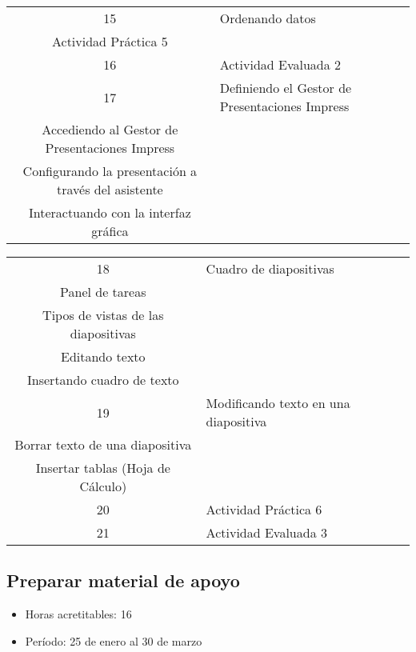 \begin{center}
\begin{tabular}{|c|p{10cm}|}
                        15 & \raggedright Ordenando datos
                        \\ Actividad Práctica 5
                        \tabularnewline \hline
                        
                        16 & \raggedright Actividad Evaluada 2
                        \tabularnewline \hline

                        17 & \raggedright Definiendo el Gestor de Presentaciones Impress
                        \\ Accediendo al Gestor de Presentaciones Impress
                        \\ Configurando la presentación a través del asistente
                        \\ Interactuando con la interfaz gráfica
                        \tabularnewline \hline
                         
                        \end{tabular}     
                        
                        \begin{tabular}{|c|p{10cm}|}\hline 
                        
                        18 & \raggedright Cuadro de diapositivas
                        \\ Panel de tareas
                        \\ Tipos de vistas de las diapositivas
                        \\ Editando texto
                        \\ Insertando cuadro de texto
                        \tabularnewline \hline
                        19 & \raggedright Modificando texto en una diapositiva
                        \\ Borrar texto de una diapositiva
                        \\ Insertar tablas (Hoja de Cálculo)
                        \tabularnewline \hline
                        
                        20 & \raggedright Actividad Práctica 6
                        \tabularnewline \hline
                        21 & \raggedright Actividad Evaluada 3
                        \tabularnewline \hline
                        
            \end{tabular}                                
            \end{center}	 
             \subsection {Preparar material de apoyo}
             \begin{itemize}
                 \item Horas acretitables: 16
                 \item Período: 25 de enero al 30 de marzo
                \end{itemize}
                
